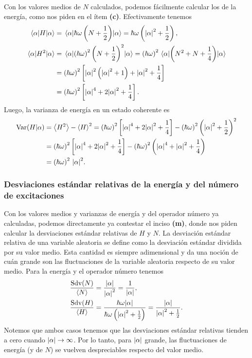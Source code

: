 \documentclass[10pt, a4paper]{article}
\newcommand{\N}{N}
\numberwithin{equation}{subsection}
\begin{document}
Con los valores medios de $\N$ calculados, podemos fácilmente calcular los de
la energía, como nos piden en el ítem \textbf{(c)}. Efectivamente tenemos
\begin{align}
  \expval{H}{\alpha} &= \expval{\hbar\omega\left(\N +
    \frac{1}{2}\right)}{\alpha} = \hbar\omega \left(\abs{\alpha}^2 +
    \frac{1}{2}\right), \label{eq:expval_H_alpha} \\
  \expval{H^2}{\alpha} &= \expval{\left(\hbar\omega\right)^2\left(\N +
    \frac{1}{2}\right)^2}{\alpha} = \left(\hbar\omega\right)^2
    \expval{\left(\N^2 + \N + \frac{1}{4}\right)}{\alpha} \nonumber \\
  &= \left(\hbar\omega\right)^2 \left[\abs{\alpha}^2\left(\abs{\alpha}^2 +
    1\right) + \abs{\alpha}^2 + \frac{1}{4}\right] \nonumber \\
  &= \left(\hbar\omega\right)^2 \left[\abs{\alpha}^4 + 2\abs{\alpha}^2 +
    \frac{1}{4}\right].
\end{align}
Luego, la varianza de energía en un estado coherente es
\begin{align}
  \Var(H|\alpha) &= \expval{H^2} - \expval{H}^2 = \left(\hbar\omega\right)^2
    \left[\abs{\alpha}^4 + 2\abs{\alpha}^2 + \frac{1}{4}\right] -
    \left(\hbar\omega\right)^2\left(\abs{\alpha}^2 + \frac{1}{2}\right)^2
    \nonumber \\
  &= \left(\hbar\omega\right)^2 \left[\abs{\alpha}^4 + 2\abs{\alpha}^2 +
    \frac{1}{4}\right] - \left(\hbar\omega\right)^2\left(\abs{\alpha}^4 +
    \abs{\alpha}^2 + \frac{1}{4}\right) \nonumber \\
  &= \left(\hbar\omega\right)^2 \,\abs{\alpha}^2.
\end{align}

\subsubsection{Desviaciones estándar relativas de la energía y del número de
  excitaciones}

Con los valores medios y varianzas de energía y del operador número ya
calculadas, podemos directamente ya contestar el inciso \textbf{(m)}, donde nos
piden calcular la desviaciones estándar relativas de $H$ y $\N$. La desviación
estándar relativa de una variable aleatoria se define como la desviación
estándar dividida por su valor medio. Esta cantidad es siempre adimensional y
da una noción de cuán grande son las fluctuaciones de la variable aleatoria
respecto de su valor medio. Para la energía y el operador número tenemos
\begin{align}
  \frac{\Sdv(\N)}{\expval{\N}} &= \frac{\abs{\alpha}}{\abs{\alpha}^2} =
    \frac{1}{\abs{\alpha}}, \\
  \frac{\Sdv(H)}{\expval{H}} &= \frac{\hbar\omega\abs{\alpha}}
    {\hbar\omega\left(\abs{\alpha}^2 + \frac{1}{2}\right)} =
    \frac{\abs{\alpha}} {\abs{\alpha}^2 + \frac{1}{2}}.
\end{align}
Notemos que ambos casos tenemos que las desviaciones estándar relativas tienden
a cero cuando $\abs{\alpha} \to \infty$. Por lo tanto, para $\abs{\alpha}$
grande, las fluctuaciones de energía (y de $\N$) se vuelven despreciables
respecto del valor medio.
\end{document}
